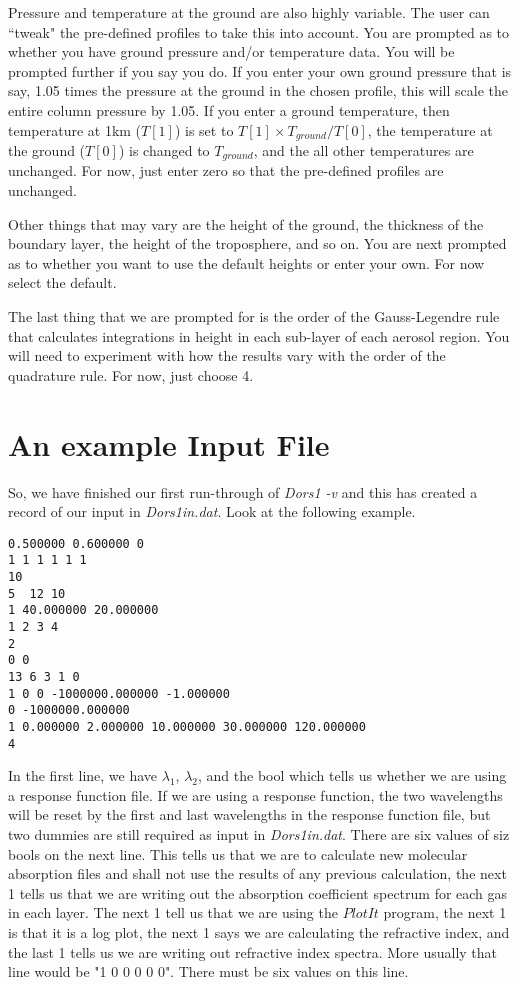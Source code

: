 \documentclass[12pt]{article}
\begin{document}
Pressure and temperature at the ground are also highly variable. The user can ``tweak" the
pre-defined profiles to take this into account. You are prompted as to whether you have ground pressure
and/or temperature data. You will be prompted further if you say you do. If you enter
your own ground pressure that is say, 1.05 times the pressure at the ground
in the chosen profile, this will scale the entire column pressure by 1.05. If you enter a ground
temperature, then 
temperature at 1km ($T[1]$) is set to $T[1]\times T_{ground}/T[0]$, the temperature
 at the ground ($T[0]$) is changed to $T_{ground}$, and the all other temperatures are unchanged. For now, just
enter zero so that the pre-defined profiles are unchanged.

Other things that may vary are the height of the ground, the thickness of the boundary layer,
 the height of the troposphere, and so on. You are next prompted as to whether you want to
use the default heights or enter your own. For now select the default.

The last thing that we are prompted for is the order of the 
 Gauss-Legendre rule that calculates integrations in height in each sub-layer of each
aerosol region. 
You will need to experiment with how the results vary with the order of the quadrature rule. For now, just choose 4.

\section{An example Input File}

So, we have finished our first run-through of {\it Dors1 -v} and this has created a record of our input in
 {\it Dors1in.dat}. Look at the following example.
\begin{verbatim}
0.500000 0.600000 0 
1 1 1 1 1 1
10
5  12 10
1 40.000000 20.000000
1 2 3 4
2
0 0
13 6 3 1 0
1 0 0 -1000000.000000 -1.000000
0 -1000000.000000
1 0.000000 2.000000 10.000000 30.000000 120.000000
4
\end{verbatim}
In the first line, we have $\lambda_1$, $\lambda_2$, and the bool which tells us whether
we are using a response function file. If we are using a response function, the two wavelengths
will be reset by the first and last wavelengths in the response function file, but two dummies are still required as input in
{\it Dors1in.dat}. There are six values of siz bools on the next line. This tells us that we are to calculate new molecular absorption files and shall not use the results of any previous calculation, the next 1 tells us that we are writing out
 the absorption coefficient spectrum for each gas in each layer. The next 1 tell us that we are using
the $PlotIt$ program, the next 1 is that it is a  log plot, the next 1 says we are calculating the refractive index, 
 and the last 1 tells us we are writing out
refractive index spectra. More usually that line would be "1 0 0 0 0 0". There must be six values on this line.
 
\end{document}
